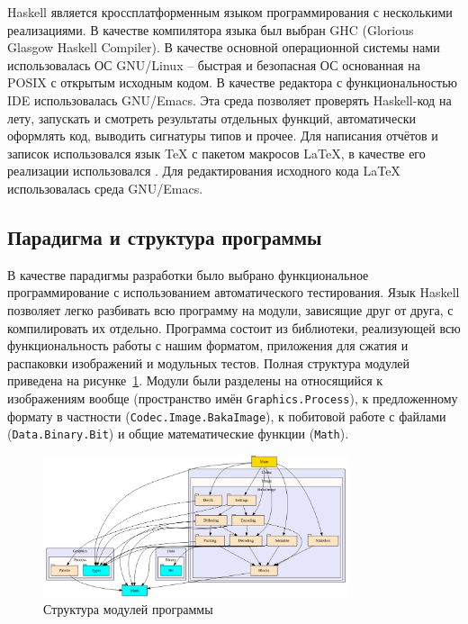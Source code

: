 \documentclass[a4paper,12pt]{article}
\numberwithin{equation}{section}
\begin{document}
Haskell является кроссплатформенным языком программирования с несколькими
реализациями. В качестве компилятора языка был выбран GHC (Glorious Glasgow
Haskell Compiler). В качестве основной операционной системы нами использовалась
ОС GNU/Linux -- быстрая и безопасная ОС основанная на POSIX с открытым исходным
кодом. В качестве редактора с функциональностью IDE использовалась
GNU/Emacs. Эта среда позволяет проверять Haskell-код на лету, запускать и
смотреть результаты отдельных функций, автоматически оформлять код, выводить
сигнатуры типов и прочее. Для написания отчётов и записок использовался язык
\TeX{} с пакетом макросов \LaTeX{}, в качестве его реализации использовался
\XeLaTeX{}. Для редактирования исходного кода \LaTeX{} использовалась среда
GNU/Emacs.

\subsection{Парадигма и структура программы}

В качестве парадигмы разработки было выбрано функциональное программирование с
использованием автоматического тестирования. Язык Haskell позволяет легко
разбивать всю программу на модули, зависящие друг от друга, с компилировать их
отдельно. Программа состоит из библиотеки, реализующей всю функциональность
работы с нашим форматом, приложения для сжатия и распаковки изображений и
модульных тестов. Полная структура модулей приведена на
рисунке~\ref{fig:structure}. Модули были разделены на относящийся к изображениям
вообще (пространство имён \texttt{Graphics.Process}), к предложенному формату в
частности (\texttt{Codec.Image.BakaImage}), к побитовой работе с файлами
(\texttt{Data.Binary.Bit}) и общие математические функции (\texttt{Math}).

\begin{figure}
  \centering
  \includegraphics[width=0.8\textwidth]{img/structure}
  \caption{Структура модулей программы}
  \label{fig:structure}
\end{figure}
\end{document}
